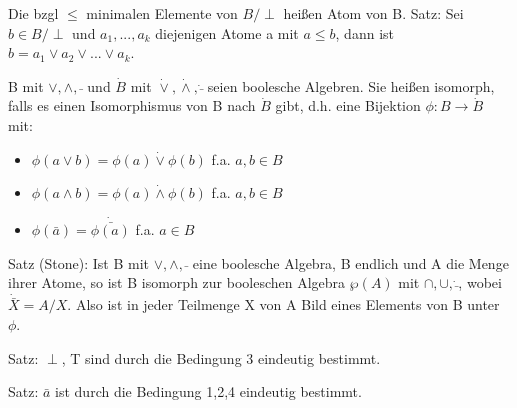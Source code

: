 \documentclass[a4paper]{article}
\begin{document}
\begin{multicols}{3}
    Die bzgl $\leq$ minimalen Elemente von $B /\perp$ heißen Atom von B.
    Satz: Sei $b\in B /\perp$ und $a_1,...,a_k$ diejenigen Atome a mit $a\leq b$, dann ist $b= a_1 \vee a_2 \vee ... \vee a_k$.
    
    B mit $\vee, \wedge, \bar{ }$ und $\dot{B}$ mit $\dot{\vee}, \dot{\wedge}, \dot{\bar{}}$ seien boolesche Algebren. Sie heißen isomorph, falls es einen Isomorphismus von B nach $\dot{B}$ gibt, d.h. eine Bijektion $\phi: B \rightarrow \dot{B}$ mit:
    \begin{itemize}
        \item $\phi(a\vee b) =\phi(a)\dot{\vee}\phi(b)$ f.a. $a,b \in B$
        \item $\phi(a\wedge b)=\phi(a)\dot{\wedge}\phi(b)$ f.a. $a,b\in B$
        \item $\phi(\bar{a}) = \dot{\bar{\phi(a)}}$ f.a. $a\in B$
    \end{itemize}
    
    Satz (Stone): Ist B mit $\vee, \wedge, \bar{}$ eine boolesche Algebra, B endlich und A die Menge ihrer Atome, so ist B isomorph zur booleschen Algebra $\wp(A)$ mit $\cap,\cup,\dot{\bar{}}$, wobei $\dot{\bar{X}}=A/X$.
    Also ist in jeder Teilmenge X von A Bild eines Elements von B unter $\phi$.
    
    Satz: $\perp$, T sind durch die Bedingung 3 eindeutig bestimmt.
    
    Satz: $\bar{a}$ ist durch die Bedingung 1,2,4 eindeutig bestimmt.
    

\end{multicols}
\end{document}
